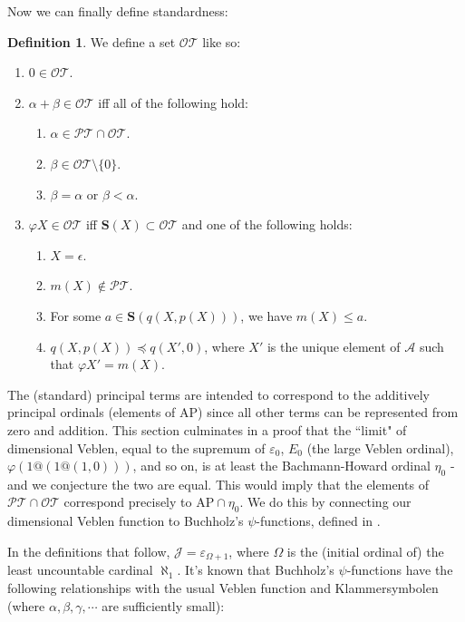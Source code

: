 \documentclass{article}
\theoremstyle{definition}
\newtheorem{definition}{Definition}[section]
\theoremstyle{plain}
\theoremstyle{plain}
\theoremstyle{plain}
\theoremstyle{plain}
\theoremstyle{remark}
\theoremstyle{remark}
\theoremstyle{remark}
\theoremstyle{plain}
\theoremstyle{plain}
\begin{document}
Now we can finally define standardness:

\begin{definition}
We define a set $\mathcal{OT}$ like so:

\begin{enumerate}
    \item $0 \in \mathcal{OT}$.
    \item $\alpha+\beta \in \mathcal{OT}$ iff all of the following hold:
    \begin{enumerate}
        \item $\alpha \in \mathcal{PT} \cap \mathcal{OT}$.
        \item $\beta \in \mathcal{OT} \setminus \{0\}$.
        \item $\beta = \alpha$ or $\beta < \alpha$.
    \end{enumerate}
    \item $\varphi X \in \mathcal{OT}$ iff $\mathbf{S}(X) \subset \mathcal{OT}$ and one of the following holds:
    \begin{enumerate}
        \item $X = \epsilon$.
        \item $m(X) \notin \mathcal{PT}$.
        \item For some $a \in \mathbf{S}(q(X,p(X)))$, we have $m(X) \leq a$.
        \item $q(X,p(X)) \preceq q(X',0)$, where $X'$ is the unique element of $\mathcal{A}$ such that $\varphi X' = m(X)$.
    \end{enumerate}
\end{enumerate}
\end{definition}

The (standard) principal terms are intended to correspond to the additively principal ordinals (elements of $\mathrm{AP}$) since all other terms can be represented from zero and addition. This section culminates in a proof that the ``limit" of dimensional Veblen, equal to the supremum of $\varepsilon_0$, $E_0$ (the large Veblen ordinal), $\varphi(1@(1@(1,0)))$, and so on, is at least the Bachmann-Howard ordinal $\eta_0$ - and we conjecture the two are equal. This would imply that the elements of $\mathcal{PT} \cap \mathcal{OT}$ correspond precisely to $\mathrm{AP} \cap \eta_0$. We do this by connecting our dimensional Veblen function to Buchholz's $\psi$-functions, defined in \cite{buchholz}.

In the definitions that follow, $\mathcal{J} = \varepsilon_{\Omega+1}$, where $\Omega$ is the (initial ordinal of) the least uncountable cardinal $\aleph_1$. It's known that Buchholz's $\psi$-functions have the following relationships with the usual Veblen function and Klammersymbolen (where $\alpha, \beta, \gamma, \cdots$ are sufficiently small):
\end{document}
